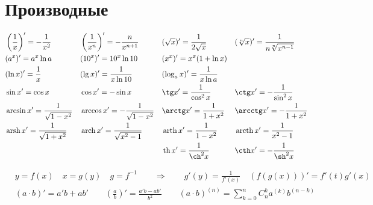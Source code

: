 \documentclass[a4paper,12pt]{article}
\DeclareMathOperator{\thh}{\mathop{th}}
\DeclareMathOperator{\arsh}{\mathop{arsh}}
\DeclareMathOperator{\arch}{\mathop{arch}}
\DeclareMathOperator{\arth}{\mathop{arth}}
\DeclareMathOperator{\arcth}{\mathop{arcth}}
\begin{document}

\section{Производные}

\begin{mdframed}[innertopmargin=-.6\baselineskip,linewidth=.8pt]
\begin{align*}
 &  \left( \frac 1 x \right)' = - \frac 1 {x^2}
 && \left( \frac 1 {x^n} \right)' = - \frac n {x^{n+1}}
 && ( \sqrt{x} )' = \frac 1 {2\sqrt{x}}
 && ( \sqrt[n] x )' = \frac 1 {n \sqrt[n]{x^{n-1}}}
\\& (a^x)' = a^x \ln a
 && (10^x)' = 10^x \ln 10
 && (x^x)' = x^x (1+\ln x)
 &&
\\& (\ln x)' = \frac 1 x
 && (\lg x)' = \frac 1 {x \ln 10}
 && ( \log_{a}x  )' = \frac 1 {x \ln a}
 &&
\\& \sin x' = \cos x
 && \cos x' = - \sin x
 && \tg x' = \frac 1 {\cos^2 x}
 && \ctg x' = - \frac 1 {\sin^2 x}
\\& \arcsin x' = \frac 1 {\sqrt{1-x^2}}
 && \arccos x' = - \frac 1 {\sqrt{1-x^2}}
 && \arctg x' = \frac 1 {1+x^2}
 && \arcctg x' = - \frac 1 {1+x^2}
\\& \arsh x' = \frac 1 {\sqrt{1+x^2}}
 && \arch x' = \frac 1 {\sqrt{x^2-1}}
 && \arth x' = \frac 1 {1-x^2}
 && \arcth x' = \frac 1 {x^2-1}
\\& 
 && 
 && \thh x' = \frac 1 {\ch^2 x}
 && \cth x' = - \frac 1 {\sh^2 x}
\end{align*}
\end{mdframed}

\begin{mdframed}[innertopmargin=-.6\baselineskip,linewidth=.8pt]
\begin{align*}
&  y = f(x) \quad x = g(y) \quad g = f^{-1}
  \qquad \Rightarrow \qquad
  g'(y) = \frac 1 {f'(x)} \quad
  \left( f(g(x)) \right)' = f'(t) g'(x)
\\&     (a \cdot b)' = a'b + ab'
\qquad \left( \frac a b \right)' = \frac{a'b-ab'}{b^2}
\qquad (a \cdot b)^{(n)} = \sum_{k=0}^n{C_n^k a^{(k)} b^{(n-k)}}
\end{align*}
\end{mdframed}
\end{document}
